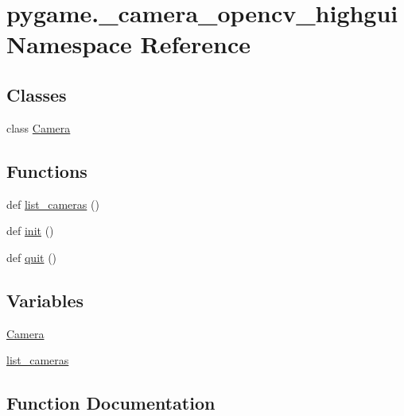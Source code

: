 \hypertarget{namespacepygame_1_1__camera__opencv__highgui}{}\section{pygame.\+\_\+camera\+\_\+opencv\+\_\+highgui Namespace Reference}
\label{namespacepygame_1_1__camera__opencv__highgui}
\subsection*{Classes}
\begin{DoxyCompactItemize}
\item 
class \hyperlink{classpygame_1_1__camera__opencv__highgui_1_1_camera}{Camera}
\end{DoxyCompactItemize}
\subsection*{Functions}
\begin{DoxyCompactItemize}
\item 
def \hyperlink{namespacepygame_1_1__camera__opencv__highgui_aa8c47269149294ec8979a192586eb032}{list\+\_\+cameras} ()
\item 
def \hyperlink{namespacepygame_1_1__camera__opencv__highgui_aa25da073fdf880dfdbbdba7e87e829f8}{init} ()
\item 
def \hyperlink{namespacepygame_1_1__camera__opencv__highgui_a1381ef96cd2bb73e573d26e7d8b4409e}{quit} ()
\end{DoxyCompactItemize}
\subsection*{Variables}
\begin{DoxyCompactItemize}
\item 
\hyperlink{namespacepygame_1_1__camera__opencv__highgui_a5bdb4398379f26ea7a1a1b14c13424e9}{Camera}
\item 
\hyperlink{namespacepygame_1_1__camera__opencv__highgui_a214e21f20d862e2d6a017828214c068c}{list\+\_\+cameras}
\end{DoxyCompactItemize}


\subsection{Function Documentation}
\mbox{\label{namespacepygame_1_1__camera__opencv__highgui_aa25da073fdf880dfdbbdba7e87e829f8}} 
